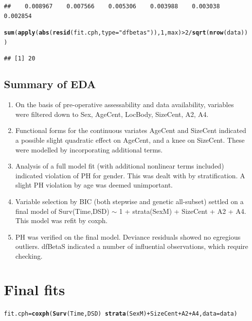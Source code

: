 \documentclass{article}\usepackage[]{graphicx}\usepackage[]{color}
\makeatletter
\newcommand{\hlnum}[1]{\textcolor[rgb]{0.686,0.059,0.569}{#1}}%
\newcommand{\hlstr}[1]{\textcolor[rgb]{0.192,0.494,0.8}{#1}}%
\newcommand{\hlopt}[1]{\textcolor[rgb]{0,0,0}{#1}}%
\newcommand{\hlstd}[1]{\textcolor[rgb]{0.345,0.345,0.345}{#1}}%
\newcommand{\hlkwb}[1]{\textcolor[rgb]{0.69,0.353,0.396}{#1}}%
\newcommand{\hlkwc}[1]{\textcolor[rgb]{0.333,0.667,0.333}{#1}}%
\newcommand{\hlkwd}[1]{\textcolor[rgb]{0.737,0.353,0.396}{\textbf{#1}}}%
\newenvironment{kframe}{%
 \def\at@end@of@kframe{}%
 \ifinner\ifhmode%
  \def\at@end@of@kframe{\end{minipage}}%
  \begin{minipage}{\columnwidth}%
 \fi\fi%
 \def\FrameCommand##1{\hskip\@totalleftmargin \hskip-\fboxsep
 \colorbox{shadecolor}{##1}\hskip-\fboxsep
     \hskip-\linewidth \hskip-\@totalleftmargin \hskip\columnwidth}%
 \MakeFramed {\advance\hsize-\width
   \@totalleftmargin\z@ \linewidth\hsize
   \@setminipage}}%
 {\par\unskip\endMakeFramed%
 \at@end@of@kframe}
\newenvironment{knitrout}{}{} %
\makeatother
\begin{document}
\begin{knitrout}
\begin{kframe}
\begin{verbatim}
##    0.008967    0.007566    0.005306    0.003988    0.003038    0.002854
\end{verbatim}
\begin{alltt}
\hlkwd{sum}\hlstd{(}\hlkwd{apply}\hlstd{(}\hlkwd{abs}\hlstd{(}\hlkwd{resid}\hlstd{(fit.cph,} \hlkwc{type} \hlstd{=} \hlstr{"dfbetas"}\hlstd{)),} \hlnum{1}\hlstd{, max)} \hlopt{>} \hlnum{2}\hlopt{/}\hlkwd{sqrt}\hlstd{(}\hlkwd{nrow}\hlstd{(data)))}
\end{alltt}
\begin{verbatim}
## [1] 20
\end{verbatim}
\end{kframe}
\end{knitrout}

\subsection{Summary of EDA}
\begin{enumerate}
\item On the basis of pre-operative assessability and data availability, variables were filtered down to Sex, AgeCent, LocBody, SizeCent, A2, A4.
\item Functional forms for the continuous variates AgeCent and SizeCent indicated a possible slight quadratic effect on AgeCent, and a knee on SizeCent.  These were modelled by incorporating additional terms.
\item Analysis of a full model fit (with additional nonlinear terms included) indicated violation of PH for gender.  This was dealt with by stratification.  A slight PH violation by age was deemed unimportant. 
\item Variable selection by BIC (both stepwise and genetic all-subset) settled on a final model of Surv(Time,DSD) $\sim$ 1 + strata(SexM) + SizeCent + A2 + A4.  This model was refit by coxph. 
\item PH was verified on the final model.  Deviance residuals showed no egregious outliers. dfBetaS indicated a number of influential observations, which require checking.
\end{enumerate}

\section{Final fits}
\begin{knitrout}
\color{fgcolor}\begin{kframe}
\begin{alltt}
\hlstd{fit.cph} \hlkwb{=} \hlkwd{coxph}\hlstd{(}\hlkwd{Surv}\hlstd{(Time, DSD)} \hlopt{~} \hlkwd{strata}\hlstd{(SexM)} \hlopt{+} \hlstd{SizeCent} \hlopt{+} \hlstd{A2} \hlopt{+} \hlstd{A4,} \hlkwc{data} \hlstd{= data)}
\end{alltt}
\end{kframe}
\end{knitrout}
\end{document}
